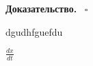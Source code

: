 \begin{theor}

\end{theor}
\textbf{Доказательство.}  \
$\square$ 

dgudhfguefdu

$\frac{dx}{dt}$










